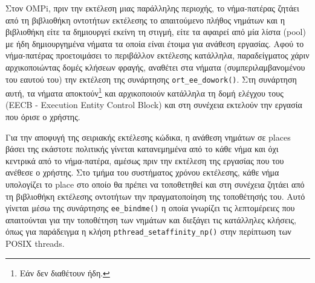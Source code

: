 Στον OMPi, πριν την εκτέλεση μιας παράλληλης περιοχής, το νήμα-πατέρας ζητάει από τη βιβλιοθήκη οντοτήτων εκτέλεσης το απαιτούμενο πλήθος νημάτων και η βιβλιοθήκη είτε τα δημιουργεί εκείνη τη στιγμή, είτε τα αφαιρεί από μία λίστα (pool) με ήδη δημιουργημένα νήματα τα οποία είναι έτοιμα για ανάθεση εργασίας. Αφού το νήμα-πατέρας προετοιμάσει το περιβάλλον εκτέλεσης κατάλληλα, παραδείγματος χάριν αρχικοποιώντας δομές κλήσεων φραγής, αναθέτει στα νήματα (συμπεριλαμβανομένου του εαυτού του) την εκτέλεση της συνάρτησης \texttt{ort\_ee\_dowork()}. Στη συνάρτηση αυτή, τα νήματα αποκτούν\footnote{Εάν δεν διαθέτουν ήδη.} και αρχικοποιούν κατάλληλα τη δομή ελέγχου τους (EECB - Execution Entity Control Block) και στη συνέχεια εκτελούν την εργασία που όρισε ο χρήστης.

Για την αποφυγή της σειριακής εκτέλεσης κώδικα, η ανάθεση νημάτων σε places βάσει της εκάστοτε πολιτικής γίνεται κατανεμημένα από το κάθε νήμα και όχι κεντρικά από το νήμα-πατέρα, αμέσως πριν την εκτέλεση της εργασίας που του ανέθεσε ο χρήστης. Στο τμήμα του συστήματος χρόνου εκτέλεσης, κάθε νήμα υπολογίζει το place στο οποίο θα πρέπει να τοποθετηθεί και στη συνέχεια ζητάει από τη βιβλιοθήκη εκτέλεσης οντοτήτων την πραγματοποίηση της τοποθέτησής του. Αυτό γίνεται μέσω της συνάρτησης \texttt{ee\_bindme()} η οποία γνωρίζει τις λεπτομέρειες που απαιτούνται για την τοποθέτηση των νημάτων και διεξάγει τις κατάλληλες κλήσεις, όπως για παράδειγμα η κλήση \texttt{pthread\_setaffinity\_np()} στην περίπτωση των POSIX threads.

